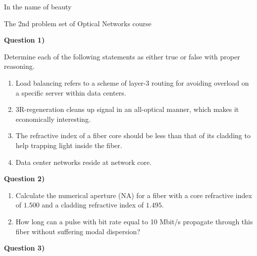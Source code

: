 \documentclass[10pt,letterpaper]{article}
\newcommand{\Q}[1]{\textbf{Question #1)}}
\begin{document}
\Large
\begin{center}
In the name of beauty

The 2nd problem set of Optical Networks course

\hrulefill
\end{center}
\Q1

Determine each of the following statements as either true or false with proper reasoning.

\begin{enumerate}[label=\alph*)]
\item
Load balancing refers to a scheme of layer-3 routing for avoiding overload on a specific server within data centers.
\item
3R-regeneration cleans up signal in an all-optical manner, which makes it economically interesting.
\item
The refractive index of a fiber core should be less than that of its cladding to help trapping light inside the fiber.
\item
Data center networks reside at network core.
\end{enumerate}

\Q2

\begin{enumerate}[label=\alph*.]
\item
Calculate the numerical aperture (NA) for a fiber with a core refractive index of $1.500$ and a cladding refractive index of $1.495$.
\item
How long can a pulse with bit rate equal to 10 Mbit/s propagate through this fiber without suffering modal dispersion?
\end{enumerate}

\Q3
\end{document}
